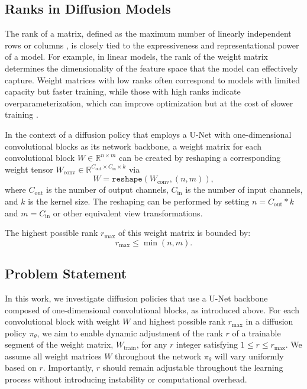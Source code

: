 \subsection{Ranks in Diffusion Models}
\label{sec:ranks_in_diffusion_models}
The rank of a matrix, defined as the maximum number of linearly independent rows or columns \cite{strang2022introduction}, is closely tied to the expressiveness and representational power of a model. For example, in linear models, the rank of the weight matrix determines the dimensionality of the feature space that the model can effectively capture. Weight matrices with low ranks often correspond to models with limited capacity but faster training, while those with high ranks indicate overparameterization, which can improve optimization but at the cost of slower training \cite{du2018power}.

In the context of a diffusion policy that employs a U-Net with one-dimensional convolutional blocks as its network backbone, a weight matrix for each convolutional block \( W \in \mathbb{R}^{n \times m} \) can be created by reshaping a corresponding weight tensor $W_{\text{conv}} \in \mathbb{R}^{C_{\text{out}} \times C_{\text{in}} \times k}$ via
$$
W = \texttt{reshape}(W_{\text{conv}}, (n, m)),
$$ 
where \( C_{\text{out}} \) is the number of output channels, \( C_{\text{in}} \) is the number of input channels, and \( k \) is the kernel size. The reshaping can be performed by setting $n=C_{\text{out}} * k$ and $m=C_{\text{in}}$ or other equivalent view transformations.

The highest possible rank \( r_{\text{max}} \) of this weight matrix is bounded by:
$$
r_{\text{max}} \leq \min(n, m).
$$

\subsection{Problem Statement}
\label{sec:problem_statement}

In this work, we investigate diffusion policies that use a U-Net backbone composed of one-dimensional convolutional blocks, as introduced above.  For each convolutional block with weight \( W \) and highest possible rank \( r_{\text{max}} \) in a diffusion policy \( \pi_{\theta} \), we aim to enable dynamic adjustment of the rank \( r \) of a trainable segment of the weight matrix, \( W_{\text{train}} \), for any $r$ integer satisfying \( 1 \leq r \leq r_{\text{max}} \).  We assume all weight matrices $W$ throughout the network $\pi_\theta$ will vary uniformly based on $r$.  Importantly, $r$ should remain adjustable throughout the learning process without introducing instability or computational overhead.  

